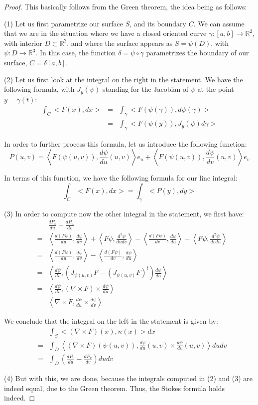 \documentclass[12pt]{amsbook}
\begin{document}
\begin{proof}
This basically follows from the Green theorem, the idea being as follows:

\medskip

(1) Let us first parametrize our surface $S$, and its boundary $C$. We can assume that we are in the situation where we have a closed oriented curve $\gamma:[a,b]\to\mathbb R^2$, with interior $D\subset\mathbb R^2$, and where the surface appears as $S=\psi(D)$, with $\psi:D\to\mathbb R^3$. In this case, the function $\delta=\psi\circ\gamma$ parametrizes the boundary of our surface, $C=\delta[a,b]$.

\medskip

(2) Let us first look at the integral on the right in the statement. We have the following formula, with $J_y(\psi)$ standing for the Jacobian of $\psi$ at the point $y=\gamma(t)$:
\begin{eqnarray*}
\int_C<F(x),dx>
&=&\int_\gamma<F(\psi(\gamma)),d\psi(\gamma)>\\
&=&\int_\gamma<F(\psi(y)),J_y(\psi)d\gamma>
\end{eqnarray*}

In order to further process this formula, let us introduce the following function:
$$P(u,v)=\left<F(\psi(u,v)),\frac{d\psi}{du}(u,v)\right>e_u+\left<F(\psi(u,v)),\frac{d\psi}{dv}(u,v)\right>e_v$$

In terms of this function, we have the following formula for our line integral:
$$\int_C<F(x),dx>=\int_\gamma<P(y),dy>$$

(3) In order to compute now the other integral in the statement, we first have:
\begin{eqnarray*}
&&\frac{dP_v}{du}-\frac{dP_u}{dv}\\
&=&\left<\frac{d(F\psi)}{du},\frac{d\psi}{dv}\right>+\left<F\psi,\frac{d^2\psi}{dudv}\right>
-\left<\frac{d(F\psi)}{dv},\frac{d\psi}{du}\right>-\left<F\psi,\frac{d^2\psi}{dvdu}\right>\\
&=&\left<\frac{d(F\psi)}{du},\frac{d\psi}{dv}\right>-\left<\frac{d(F\psi)}{dv},\frac{d\psi}{du}\right>\\
&=&\left<\frac{d\psi}{dv},\left(J_{\psi(u,v)}F-(J_{\psi(u,v)}F)^t\right)\frac{d\psi}{du}\right>\\
&=&\left<\frac{d\psi}{dv},(\nabla\times F)\times\frac{d\psi}{du}\right>\\
&=&\left<\nabla\times F,\frac{d\psi}{du}\times\frac{d\psi}{dv}\right>
\end{eqnarray*}

We conclude that the integral on the left in the statement is given by:
\begin{eqnarray*}
&&\int_S<(\nabla\times F)(x),n(x)>dx\\
&=&\int_D\left<(\nabla\times F)(\psi(u,v)),\frac{d\psi}{du}(u,v)\times\frac{d\psi}{dv}(u,v)\right>dudv\\
&=&\int_D\left(\frac{dP_v}{du}-\frac{dP_u}{dv}\right)dudv
\end{eqnarray*}

(4) But with this, we are done, because the integrals computed in (2) and (3) are indeed equal, due to the Green theorem. Thus, the Stokes formula holds indeed.
\end{proof}
\end{document}
